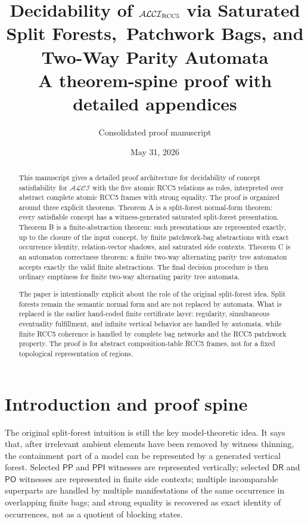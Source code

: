\documentclass[11pt]{article}
\title{Decidability of $\mathcal{ALCI}_{\mathrm{RCC5}}$ via Saturated Split Forests,\ Patchwork Bags, and Two-Way Parity Automata\\
\large A theorem-spine proof with detailed appendices}
\author{Consolidated proof manuscript}
\date{May 31, 2026}
\newcommand{\PP}{\mathsf{PP}}
\newcommand{\PPI}{\mathsf{PPI}}
\newcommand{\PO}{\mathsf{PO}}
\newcommand{\DR}{\mathsf{DR}}
\begin{document}
\maketitle

\begin{abstract}
This manuscript gives a detailed proof architecture for decidability of concept satisfiability for $\mathcal{ALCI}$ with the five atomic RCC5 relations as roles, interpreted over abstract complete atomic RCC5 frames with strong equality.  The proof is organized around three explicit theorems.  Theorem A is a split-forest normal-form theorem: every satisfiable concept has a witness-generated saturated split-forest presentation.  Theorem B is a finite-abstraction theorem: such presentations are represented exactly, up to the closure of the input concept, by finite patchwork-bag abstractions with exact occurrence identity, relation-vector shadows, and saturated side contexts.  Theorem C is an automaton correctness theorem: a finite two-way alternating parity tree automaton accepts exactly the valid finite abstractions.  The final decision procedure is then ordinary emptiness for finite two-way alternating parity tree automata.

The paper is intentionally explicit about the role of the original split-forest idea.  Split forests remain the semantic normal form and are not replaced by automata.  What is replaced is the earlier hand-coded finite certificate layer: regularity, simultaneous eventuality fulfillment, and infinite vertical behavior are handled by automata, while finite RCC5 coherence is handled by complete bag networks and the RCC5 patchwork property.  The proof is for abstract composition-table RCC5 frames, not for a fixed topological representation of regions.
\end{abstract}

\tableofcontents

\section{Introduction and proof spine}

The original split-forest intuition is still the key model-theoretic idea.  It says that, after irrelevant ambient elements have been removed by witness thinning, the containment part of a model can be represented by a generated vertical forest.  Selected $\PP$ and $\PPI$ witnesses are represented vertically; selected $\DR$ and $\PO$ witnesses are represented in finite side contexts; multiple incomparable superparts are handled by multiple manifestations of the same occurrence in overlapping finite bags; and strong equality is recovered as exact identity of occurrences, not as a quotient of blocking states.
\end{document}
